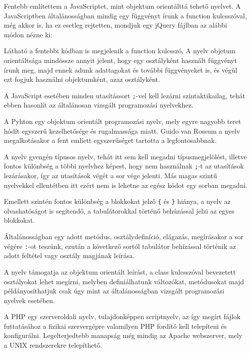 Fentebb említettem a JavaScriptet, mint objektum orientálttá tehető nyelvet. A JavaScriptben általánosságban mindig egy függvényt írunk a function kulcsszóval, még akkor is, ha ez esetleg rejtetten, mondjuk egy jQuery fájlban az alábbi módon nézne ki:


Látható a fentebbi kódban is megjelenik a function kulcsszó. A nyelv objetum orientáltsága mindössze annyit jelent, hogy egy osztályként használt függvényt írunk meg, majd ennek adunk adattagokat és további függvényeket is, és végül ezt fogjuk használni objektumként, azaz osztályként.

A JavaScript esetében minden utasítássort \texttt{;}-vel kell lezárni szintaktikailag, tehát ebben hasonlít az általánosan vizsgált programozási nyelvekhez.

A Pyhton egy objektum orientált programozási nyelv, mely egyre nagyobb teret hódít egyszerű kezelhetősége és rugalmassága miatt. Guido van Rossum a nyelv megalkotásakor a fent emlíett egyszerűséget tartotta a legfontosabbnak.

A nyelv gyengén típusos nyelv, tehát itt sem kell megadni típusmegjelölést, illetve fontos különbség a többi nyelvhez képest, hogy nem használnak \texttt{;}-t az utasítások lezárásakor, így az utasítások végét a sor vége jelenti. Más magas szintű nyelvekkel ellentétben itt ezért nem is lehetne az egész kódot egy sorban megadni.

Emellett szintén fontos különbség a blokkokat jelző \texttt{\{} és \texttt{\}} hiánya, a nyelv az olvashatóságot is segítendő, a tabulátorokkal történő behúzással jelzi az egyes blokkokat.

Általánosságban egy adott metódus, osztálydefiníció, elágazás, megírásakor a sor végére \texttt{:}-ot teszünk, ezután a következő sortól tabulátor behízással történik az adott feltétel vagy osztály magjának leírása.

A nyelv támogatja az objektum orientált leírást, a class kulcsszóval bevezetett osztályokat lehet megírni, melyben definiálhatunk változókat, metódusokat majd példányosíthatjuk csak úgy mint az általánosságban vizsgált programozási nyelvek esetében.

A PHP egy szerveroldali nyelv, tulajdonképpen scriptnyelv, az így megírt fájlok futtatásához a fizikai szervergépre valamilyen PHP fordító kell telepíteni és konfigurálni. Legelterjedtebb manapság még mindig az Apache webszerver, mely a UNIX rendszerekre telepíthető.

